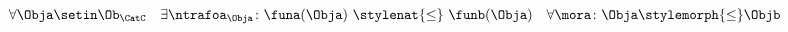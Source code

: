 {\begin{forslides}


        \begin{equation}\label{eq:ex_nt_27}
            \forall \Obja \setin\Ob_\CatC \quad \exists \ntrafoa_{\Obja} \colon \funa(\Obja) \ \stylenat{\leq} \  \funb(\Obja) \quad  \forall \mora \colon \Obja \stylemorph{\leq} \Objb
        \end{equation}



    \end{forslides}

}
